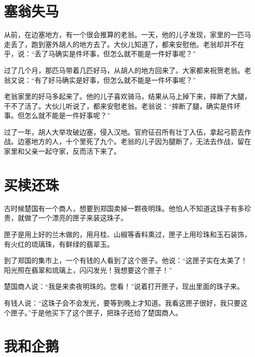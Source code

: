 \documentclass[12pt,UTF-8,openany]{ctexbook}
\begin{document}
\chapter{塞翁失马}

\begin{large}
    
    从前，在边塞地方，有一个很会推算的老翁。一天，他的儿子发现，家里的一匹马走丢了，跑到塞外胡人的地方去了。大伙儿知道了，都来安慰他。老翁却并不在乎，说：“丢了马确实是件坏事，但怎么就不能是一件好事呢？”
    
    过了几个月，那匹马带着几匹好马，从胡人的地方回来了。大家都来祝贺老翁。老翁又说：“有了好马确实是好事，但怎么就不能是一件坏事呢？”
    
    老翁家里的好马多起来了。他的儿子喜欢骑马，结果从马上掉下来，摔断了大腿，干不了活了。大伙儿听说了，都来安慰老翁。老翁说：“摔断了腿，确实是件坏事。但怎么就不能是一件好事呢？”
    
    过了一年，胡人大举攻破边塞，侵入汉地。官府征召所有壮丁入伍，拿起弓箭去作战。边塞地方的人，十个里死了九个。老翁的儿子因为腿断了，无法去作战，留在家里和父亲一起守家，反而活下来了。
    
\end{large}



\chapter{买椟还珠}

\begin{large}
    
    古时候楚国有一个商人，想要到郑国卖掉一颗夜明珠。他怕人不知道这珠子有多珍贵，就做了一个漂亮的匣子来装这珠子。
    
    匣子是用上好的兰木做的，用月桂、山椒等香料熏过，匣子上用珍珠和玉石装饰，有火红的琉璃珠，有鲜绿的翡翠玉。
    
    到了郑国的集市上，一个有钱的人看到了这个匣子。他说：“这匣子实在太美了！阳光照在翡翠和琉璃上，闪闪发光！我想要这个匣子！”
    
    楚国商人说：“我是来卖夜明珠的。您看！”说着打开匣子，现出里面的珠子来。
    
    有钱人说：“这珠子会不会发光，要等到晚上才知道。我看这匣子很好，我只要这个匣子。”于是他买下了这个匣子，把珠子还给了楚国商人。
    
\end{large}



\chapter{我和企鹅}
\end{document}
